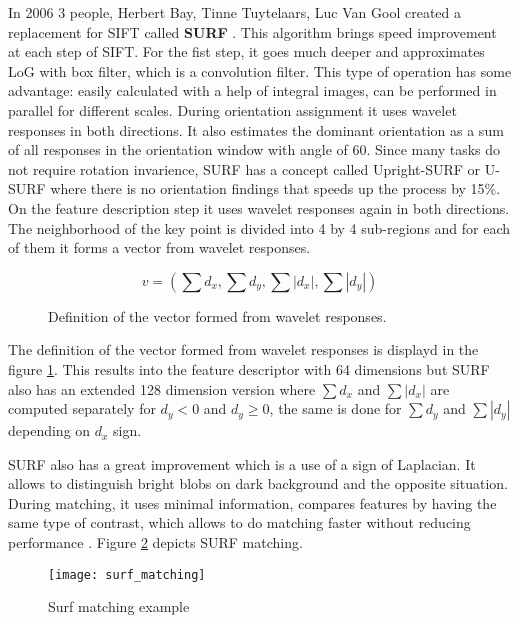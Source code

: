 \documentclass[../../../../main]{subfiles}
\begin{document}
In 2006 3 people, Herbert Bay, Tinne Tuytelaars, Luc Van Gool created a replacement for \ac{SIFT} called \textbf{\ac{SURF}} \cite{surf_bay}. This algorithm brings speed improvement at each step of \ac{SIFT}. For the fist step, it goes much deeper and approximates \ac{LoG} with box filter, which is a convolution filter. This type of operation has some advantage: easily calculated with a help of integral images, can be performed in parallel for different scales. During orientation assignment it uses wavelet responses in both directions. It also estimates the dominant orientation as a sum of all responses in the orientation window with angle of 60\degree. Since many tasks do not require rotation invarience, \ac{SURF} has a concept called Upright-SURF or U-SURF where there is no orientation findings that speeds up the process by 15\%. On the feature description step it uses wavelet responses again in both directions. The neighborhood of the key point is divided into 4 by 4 sub-regions and for each of them it forms a vector from wavelet responses.

\begin{figure} [!ht]
  \centering    
    \begin{equation}
        v = (\sum{d_x},\sum{d_y},\sum{|d_x|},\sum{|d_y|})
    \end{equation}
    \label{fig:surf_wavelet_responses}
  \caption{Definition of the vector formed from wavelet responses.}
\end{figure}

The definition of the vector formed from wavelet responses is displayd in the figure \ref{fig:surf_wavelet_responses}. This results into the feature descriptor with 64 dimensions but \ac{SURF} also has an extended 128 dimension version where $\sum{d_x}$ and $\sum{|d_x|}$ are computed separately for $d_y<0$ and $d_y\geq0$, the same is done for $\sum{d_y}$ and $\sum{|d_y|}$ depending on $d_x$ sign.

\ac{SURF} also has a great improvement which is a use of a sign of Laplacian. It allows to distinguish bright blobs on dark background and the opposite situation. During matching, it uses minimal information, compares features by having the same type of contrast, which allows to do matching faster without reducing performance \cite{opencv_docs_surf}. Figure \ref{fig:Surf_Matching} depicts \ac{SURF} matching.

\begin{figure} [ht]
    \begin{center}
        \texttt{[image: surf\_matching]}
        \caption{Surf matching example}
        \label{fig:Surf_Matching}
    \end{center}
\end{figure}
\end{document}

